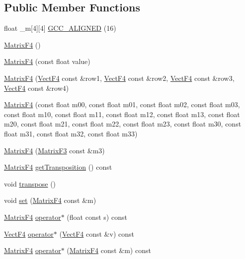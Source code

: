 \subsection*{Public Member Functions}
\begin{DoxyCompactItemize}
\item 
float \-\_\-m\mbox{[}4\mbox{]}\mbox{[}4\mbox{]} \hyperlink{classMatrixF4_ae75c804da7a25fa16643c66c5df77b38}{G\-C\-C\-\_\-\-A\-L\-I\-G\-N\-E\-D} (16)
\item 
\hyperlink{classMatrixF4_a7703bbcd22be678824564830ea0636a8}{Matrix\-F4} ()
\item 
\hyperlink{classMatrixF4_a06536ada78c655a54493d0a3a4e0b811}{Matrix\-F4} (const float value)
\item 
\hyperlink{classMatrixF4_ae78b5029299574e834eb51d392878b64}{Matrix\-F4} (\hyperlink{classVectF4}{Vect\-F4} const \&row1, \hyperlink{classVectF4}{Vect\-F4} const \&row2, \hyperlink{classVectF4}{Vect\-F4} const \&row3, \hyperlink{classVectF4}{Vect\-F4} const \&row4)
\item 
\hyperlink{classMatrixF4_a821d7645f68d4b128e9cb214d1c2d932}{Matrix\-F4} (const float m00, const float m01, const float m02, const float m03, const float m10, const float m11, const float m12, const float m13, const float m20, const float m21, const float m22, const float m23, const float m30, const float m31, const float m32, const float m33)
\item 
\hyperlink{classMatrixF4_a1046b47fe9a75f4336ce6a4c530aa0e5}{Matrix\-F4} (\hyperlink{classMatrixF3}{Matrix\-F3} const \&m3)
\item 
\hyperlink{classMatrixF4}{Matrix\-F4} \hyperlink{classMatrixF4_aec3dfeb9a94f52c442de00a94493637f}{get\-Transposition} () const 
\item 
void \hyperlink{classMatrixF4_a601cf1de43a1b6f90b9532e6f68a6d6f}{transpose} ()
\item 
void \hyperlink{classMatrixF4_a54ad8a87c212875c551c0c6493d3b128}{set} (\hyperlink{classMatrixF4}{Matrix\-F4} const \&m)
\item 
\hyperlink{classMatrixF4}{Matrix\-F4} \hyperlink{classMatrixF4_a4056e5f174b9e560891f17eea07dce06}{operator$\ast$} (float const s) const 
\item 
\hyperlink{classVectF4}{Vect\-F4} \hyperlink{classMatrixF4_a7ded363318824cfa0c736925ce498721}{operator$\ast$} (\hyperlink{classVectF4}{Vect\-F4} const \&v) const 
\item 
\hyperlink{classMatrixF4}{Matrix\-F4} \hyperlink{classMatrixF4_ac3c006966be634f3ef571853323af000}{operator$\ast$} (\hyperlink{classMatrixF4}{Matrix\-F4} const \&m) const 

\end{DoxyCompactItemize}
